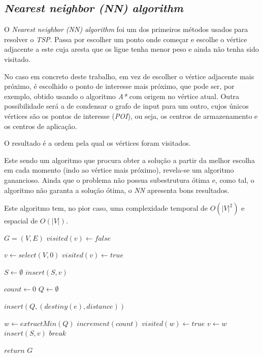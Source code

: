 \documentclass[12pt,a4paper]{report}
\begin{document}
		\subsection{\textit{Nearest neighbor (NN) algorithm}}
		O \textit{Nearest neighbor (NN) algorithm} \cite{nearestneighbor} foi um dos primeiros métodos usados para resolver o \textit{TSP}. Passa por escolher um ponto onde começar e escolhe o vértice adjacente a este cuja aresta que os ligue tenha menor peso e ainda não tenha sido visitado. \par
		No caso em concreto deste trabalho, em vez de escolher o vértice adjacente mais próximo, é escolhido o ponto de interesse mais próximo, que pode ser, por exemplo, obtido usando o algoritmo \textit{A*} com origem no vértice atual. Outra possibilidade será a de condensar o grafo de input para um outro, cujos únicos vértices são os pontos de interesse (\textit{POI}), ou seja, os centros de armazenamento e os centros de aplicação. \par
		O resultado é a ordem pela qual os vértices foram visitados. \par
		Este sendo um algoritmo que procura obter a solução a partir da melhor escolha em cada momento (indo ao vértice mais próximo), revela-se um algoritmo ganancioso. Ainda que o problema não possua subestrutura ótima e, como tal, o algoritmo não garanta a solução ótima, o \textit{NN} apresenta bons resultados. \par
		Este algoritmo tem, no pior caso, uma complexidade temporal de \(O(|V|^2) \) e espacial de \( O(|V|)\).

		\begin{center}
			\begin{algorithmic}[1]
				\State $G = (V, E)$
				\newline
					\State $visited(v) \leftarrow false$
				\EndFor

				\State $v \leftarrow select(V, 0)$
				\State $visited(v) \leftarrow true$

				\State $S \leftarrow \emptyset$
				\State $ insert(S, v) $

				\State $count \leftarrow 0$
					\State $Q \leftarrow \emptyset$

						\State $insert (Q, (destiny(e), distance))$
					\EndFor

						\State $w \leftarrow extractMin(Q)$
							\State $increment(count)$
							\State $visited(w) \leftarrow true$
							\State $v \leftarrow w$
							\State $insert(S,v)$
							\State $break$
						\EndIf
					\EndWhile

				\EndWhile
				\State $return$ $G$
				\EndFunction
			\end{algorithmic}
		\end{center}
\end{document}
